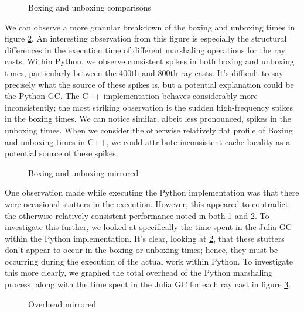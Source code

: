 \begin{figure}[ht!]
  \centering
  
  \caption{Boxing and unboxing comparisons}
  \label{fig:boxing_unboxing_basic}
  \Description{}
\end{figure}

We can observe a more granular breakdown of the boxing and unboxing times in figure \ref{fig:boxing_unboxing_mirrored}. An interesting observation from this figure is especially the structural differences in the execution time of different marshaling operations for the ray casts. Within Python, we observe consistent spikes in both boxing and unboxing times, particularly between the 400th and 800th ray casts. It's difficult to say precisely what the source of these spikes is, but a potential explanation could be the Python GC. The C++ implementation behaves considerably more inconsistently; the most striking observation is the sudden high-frequency spikes in the boxing times. We can notice similar, albeit less pronounced, spikes in the unboxing times. When we consider the otherwise relatively flat profile of Boxing and unboxing times in C++, we could attribute inconsistent cache locality as a potential source of these spikes.

\begin{figure}[ht!]
  \centering
  
  \caption{Boxing and unboxing mirrored}
  \label{fig:boxing_unboxing_mirrored}
  \Description{}
\end{figure}

One observation made while executing the Python implementation was that there were occasional stutters in the execution. However, this appeared to contradict the otherwise relatively consistent performance noted in both \ref{fig:boxing_unboxing_basic} and \ref{fig:boxing_unboxing_mirrored}. To investigate this further, we looked at specifically the time spent in the Julia GC within the Python implementation. It's clear, looking at \ref{fig:boxing_unboxing_mirrored}, that these stutters don't appear to occur in the boxing or unboxing times; hence, they must be occurring during the execution of the actual work within Python. To investigate this more clearly, we graphed the total overhead of the Python marshaling process, along with the time spent in the Julia GC for each ray cast in figure \ref{fig:overhead_mirrored}.

\begin{figure}[ht!]
  \centering
  
  \caption{Overhead mirrored}
  \label{fig:overhead_mirrored}
  \Description{}
\end{figure}

